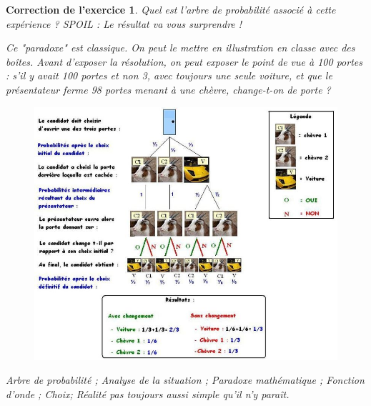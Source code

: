 \documentclass[12pt]{article}
\theoremstyle{break}
\newtheorem{cor}{Correction de l'exercice}
\begin{document}
\begin{cor}
\textit{Quel est l'arbre de probabilité associé à cette expérience ? SPOIL : Le résultat va vous surprendre !}

Ce "paradoxe" est classique. On peut le mettre en illustration en classe avec des boîtes. Avant d'exposer la résolution, on peut exposer le point de vue à 100 portes : s'il y avait 100 portes et non 3, avec toujours une seule voiture, et que le présentateur ferme 98 portes menant à une chèvre, change-t-on de porte ?\newline 
\begin{figure}[h!]
	\centering
    \includegraphics[width=1.1\textwidth]{images/SolutionMontyHall.JPG}
    
\end{figure}

\textit{Arbre de probabilité ; Analyse de la situation ; Paradoxe mathématique ; Fonction d'onde ; Choix; Réalité pas toujours aussi simple qu'il n'y paraît.}
\end{cor}
\end{document}
